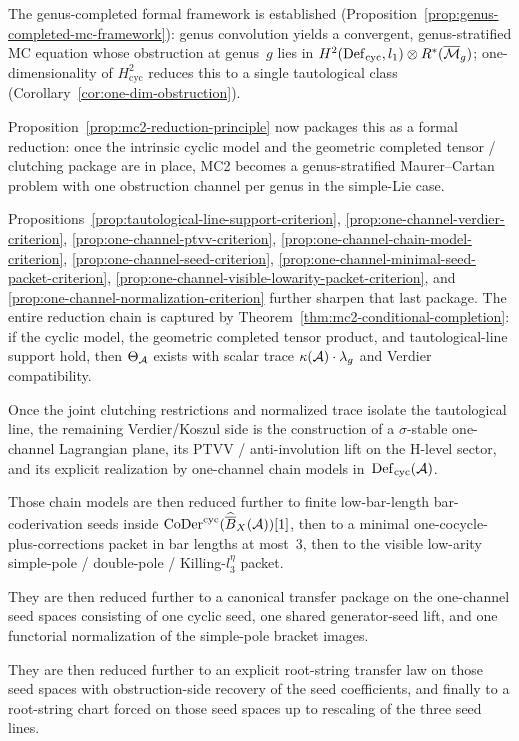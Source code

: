 \begin{remark}
The genus-completed formal framework is established
(Proposition~\ref{prop:genus-completed-mc-framework}): genus
convolution yields a convergent, genus-stratified MC equation
whose obstruction at genus~$g$ lies in
$H^2(\operatorname{Def}_{\mathrm{cyc}},l_1)\otimes R^*(\overline{\mathcal{M}}_g)$;
one-dimensionality of $H^2_{\mathrm{cyc}}$ reduces this to a
single tautological class
(Corollary~\ref{cor:one-dim-obstruction}).

Proposition~\ref{prop:mc2-reduction-principle} now packages this as a
formal reduction: once the intrinsic cyclic model and the geometric
completed tensor / clutching package are in place, MC2 becomes a
genus-stratified Maurer--Cartan problem with one obstruction channel
per genus in the simple-Lie case.

Propositions~\ref{prop:tautological-line-support-criterion},
\ref{prop:one-channel-verdier-criterion},
\ref{prop:one-channel-ptvv-criterion},
\ref{prop:one-channel-chain-model-criterion},
\ref{prop:one-channel-seed-criterion},
\ref{prop:one-channel-minimal-seed-packet-criterion},
\ref{prop:one-channel-visible-lowarity-packet-criterion}, and
\ref{prop:one-channel-normalization-criterion} further sharpen that
last package.  The entire reduction chain is captured by
Theorem~\ref{thm:mc2-conditional-completion}: if the cyclic model,
the geometric completed tensor product, and tautological-line support
hold, then $\Theta_{\mathcal{A}}$ exists with scalar trace
$\kappa(\mathcal{A})\cdot\lambda_g$ and Verdier compatibility.

Once the joint clutching restrictions and normalized trace isolate the
tautological line, the remaining Verdier/Koszul side is the construction
of a $\sigma$-stable one-channel Lagrangian plane, its PTVV /
anti-involution lift on the H-level sector, and its explicit
realization by one-channel chain models in~$\operatorname{Def}_{\mathrm{cyc}}(\mathcal{A})$.

Those chain models are then reduced further to finite low-bar-length
bar-coderivation seeds inside
$\operatorname{CoDer}^{\mathrm{cyc}}(\widehat{\overline{B}}_X(\mathcal{A}))[1]$, then
to a minimal one-cocycle-plus-corrections packet in bar lengths at
most~$3$, then to the visible low-arity simple-pole / double-pole /
Killing-$l_3^\eta$ packet.

They are then reduced further to a canonical transfer package on
the one-channel seed spaces consisting of one cyclic seed, one shared
generator-seed lift, and one functorial normalization of the
simple-pole bracket images.

They are then reduced further to an explicit root-string transfer law
on those seed spaces with obstruction-side recovery of the
seed coefficients, and finally to a root-string chart forced on those
seed spaces up to rescaling of the three seed lines.


\end{remark}
